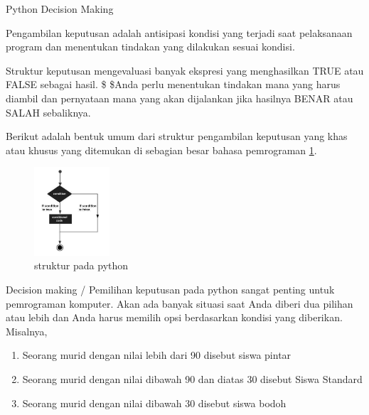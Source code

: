 \sloppy
Python Decision Making \par
\vspace{12pt}
\noindent 
Pengambilan keputusan adalah antisipasi kondisi yang terjadi saat pelaksanaan program dan menentukan tindakan yang dilakukan sesuai kondisi. \par
\vspace{12pt}
\noindent 
Struktur keputusan mengevaluasi banyak ekspresi yang menghasilkan TRUE atau FALSE sebagai hasil. \$  \$Anda perlu menentukan tindakan mana yang harus diambil dan pernyataan mana yang akan dijalankan jika hasilnya BENAR atau SALAH sebaliknya. \par
\vspace{12pt}
\noindent 
Berikut adalah bentuk umum dari struktur pengambilan keputusan yang khas atau khusus yang ditemukan di sebagian besar bahasa pemrograman
\ref{struktur}.
\begin{figure}[ht]
    \centerline{\includegraphics[width=0.25\textwidth]{figures/struktur.png}}
    \caption{struktur pada python}
    \label{struktur}
    \end{figure}\par
\vspace{12pt}
\noindent 
Decision making / Pemilihan keputusan pada python sangat penting untuk pemrograman komputer. Akan ada banyak situasi saat Anda diberi dua pilihan atau lebih dan Anda harus memilih opsi berdasarkan kondisi yang diberikan. Misalnya,
\begin{enumerate} \par
\item
Seorang murid dengan nilai lebih dari 90 disebut siswa pintar \par
\item
Seorang murid dengan nilai dibawah 90 dan diatas 30 disebut Siswa Standard \par
\item
Seorang murid dengan nilai dibawah 30 disebut siswa bodoh \par
\end{enumerate}\par
\vspace{12pt}
